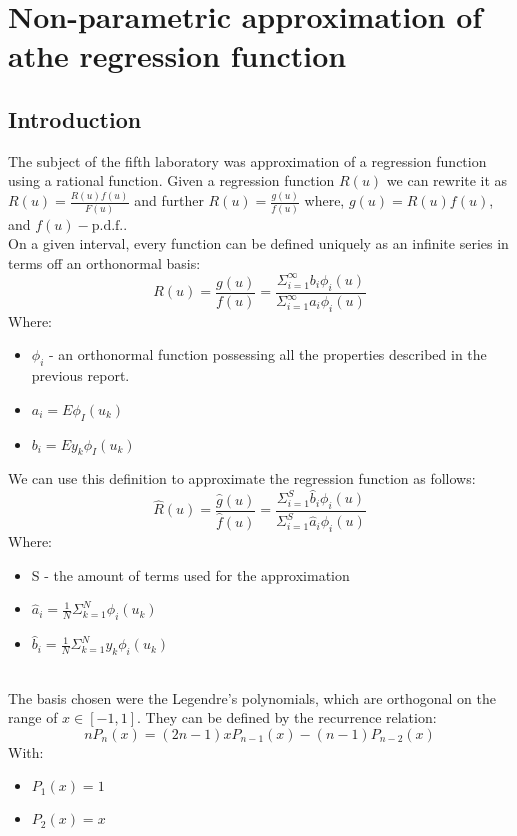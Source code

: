 \chapter{Non-parametric approximation of athe regression function}
\section{Introduction}

The subject of the fifth laboratory was approximation of a regression function using a rational function.
Given a regression function $R(u)$ we can rewrite it as  $R(u) = \frac{R(u)f(u)}{F(u)}$ and further $R(u) = \frac{g(u)}{f(u)}$ where, $g(u) = R(u)f(u)$, and  $f(u) - \text{p.d.f.}$. \\
On a given interval, every function can be defined uniquely as an infinite series in terms off an orthonormal basis:
\begin{equation}
    R(u) = \frac{g(u)}{f(u)} = \frac{\Sigma_{i=1}^{\infty}b_i\phi_i(u)}{ \Sigma_{i=1}^{\infty}a_i\phi_i(u)}
\end{equation}
Where:
\begin{itemize}
        \item $\phi_i$ - an orthonormal function possessing all the properties described in the previous report.
        \item $a_i = E\phi_I(u_k)$
        \item $b_i = E y_k\phi_I(u_k)$
\end{itemize}
We can use this definition to approximate the regression function as follows:
\begin{equation}
    \hat{R}(u) = \frac{\hat{g}(u)}{\hat{f}(u)} =   \frac{\Sigma_{i=1}^{S}\hat{b}_i\phi_i(u)}{ \Sigma_{i=1}^{S}\hat{a}_i\phi_i(u)}
\end{equation}
Where:
\begin{itemize}
        \item S - the amount of terms used for the approximation
        \item $\hat{a}_i = \frac{1}{N} \Sigma_{k=1}^{N}\phi_i(u_k)$
        \item $\hat{b}_i = \frac{1}{N} \Sigma_{k=1}^{N}y_k\phi_i(u_k)$
\end{itemize}
\\
The basis chosen were the Legendre's polynomials, which are orthogonal on the range of $x \in [-1,1]$.
They can be defined by the recurrence relation:
\begin{equation}
    nP_{n}(x) = (2n-1)xP_{n-1}(x) - (n-1)P_{n-2}(x)
\end{equation}
With:
\begin{itemize}
    \item $P_1(x)=1$
    \item $P_2(x) = x$
\end{itemize}

